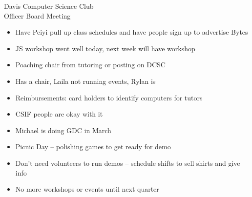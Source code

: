 \documentclass{article}
\begin{document}
\begin{Minutes}{Davis Computer Science Club\\Officer Board Meeting}




\maketitle

\begin {itemize}
    \item Have Peiyi pull up class schedules and have people sign up to advertise Bytes
\end {itemize}


\begin {itemize} 
    \item JS workshop went well today, next week will have workshop
    \item Poaching chair from tutoring or posting on DCSC
\end {itemize}

\begin {itemize}
    \item Has a chair, Laila not running events, Rylan is
\end {itemize}

\begin{itemize}
    \item Reimbursements: card holders to identify computers for tutors
    \item CSIF people are okay with it
\end {itemize}

\begin {itemize}
    \item Michael is doing GDC in March
    \item Picnic Day -- polishing games to get ready for demo
    \item Don't need volunteers to run demos -- schedule shifts to sell shirts and give info
    \item No more workshops or events until next quarter
\end {itemize}


\end{Minutes}
\end{document}
